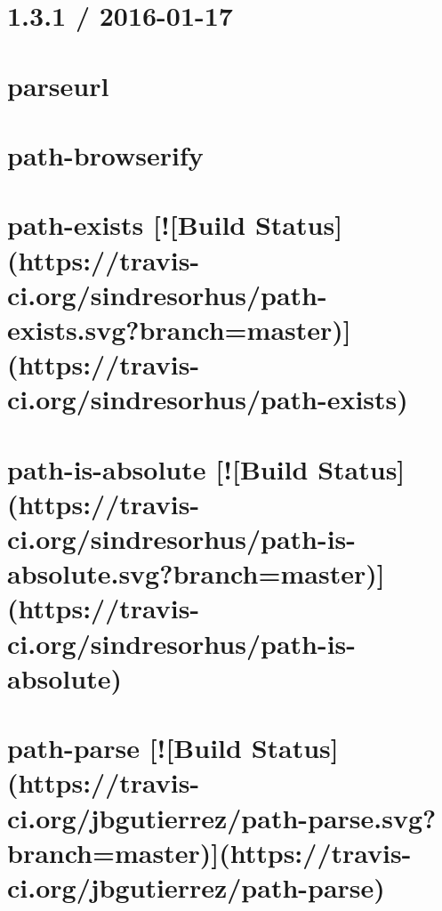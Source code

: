 \documentclass[twoside]{book}
\newcommand{\+}{\discretionary{\mbox{\scriptsize$\hookleftarrow$}}{}{}}
\begin{document}
\chapter{1.3.1 / 2016-\/01-\/17}
\label{md__c_1_workspace_demo_src_main_script_node_modules_parseurl__h_i_s_t_o_r_y}

\chapter{parseurl}
\label{md__c_1_workspace_demo_src_main_script_node_modules_parseurl__r_e_a_d_m_e}

\chapter{path-\/browserify}
\label{md__c_1_workspace_demo_src_main_script_node_modules_path-browserify_readme}

\chapter{path-\/exists \mbox{[}!\mbox{[}Build Status\mbox{]}(https\+://travis-\/ci.org/sindresorhus/path-\/exists.svg?branch=master)\mbox{]}(https\+://travis-\/ci.org/sindresorhus/path-\/exists)}
\label{md__c_1_workspace_demo_src_main_script_node_modules_path-exists_readme}

\chapter{path-\/is-\/absolute \mbox{[}!\mbox{[}Build Status\mbox{]}(https\+://travis-\/ci.org/sindresorhus/path-\/is-\/absolute.svg?branch=master)\mbox{]}(https\+://travis-\/ci.org/sindresorhus/path-\/is-\/absolute)}
\label{md__c_1_workspace_demo_src_main_script_node_modules_path-is-absolute_readme}

\chapter{path-\/parse \mbox{[}!\mbox{[}Build Status\mbox{]}(https\+://travis-\/ci.org/jbgutierrez/path-\/parse.svg?branch=master)\mbox{]}(https\+://travis-\/ci.org/jbgutierrez/path-\/parse)}
\label{md__c_1_workspace_demo_src_main_script_node_modules_path-parse__r_e_a_d_m_e}

\end{document}
